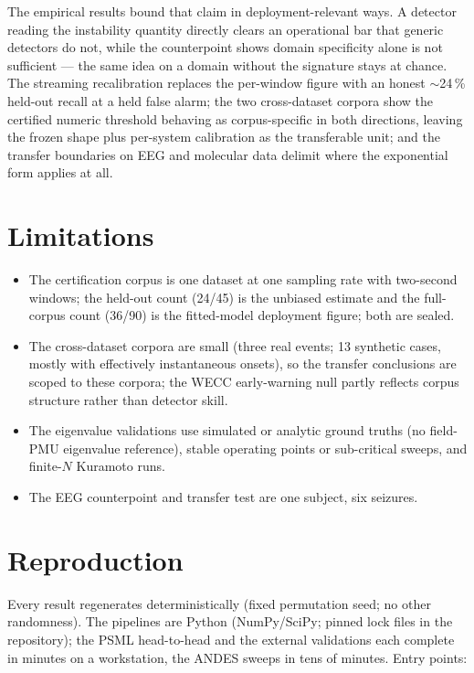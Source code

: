 \documentclass[aip,cha,preprint,amsmath,amssymb]{revtex4-2}
\begin{document}
The empirical results bound that claim in deployment-relevant ways. A
detector reading the instability quantity directly clears an
operational bar that generic detectors do not, while the counterpoint
shows domain specificity alone is not sufficient --- the same idea on a
domain without the signature stays at chance. The streaming
recalibration replaces the per-window figure with an honest
$\sim$24\,\% held-out recall at a held false alarm; the two
cross-dataset corpora show the certified numeric threshold behaving as
corpus-specific in both directions, leaving the frozen shape plus
per-system calibration as the transferable unit; and the transfer
boundaries on EEG and molecular data delimit where the exponential
form applies at all.

\section{Limitations}\label{sec:limitations}

\begin{itemize}
  \item The certification corpus is one dataset at one sampling rate
    with two-second windows; the held-out count (24/45) is the unbiased
    estimate and the full-corpus count (36/90) is the fitted-model
    deployment figure; both are sealed.
  \item The cross-dataset corpora are small (three real events; 13
    synthetic cases, mostly with effectively instantaneous onsets), so
    the transfer conclusions are scoped to these corpora; the WECC
    early-warning null partly reflects corpus structure rather than
    detector skill.
  \item The eigenvalue validations use simulated or analytic ground
    truths (no field-PMU eigenvalue reference), stable operating points
    or sub-critical sweeps, and finite-$N$ Kuramoto runs.
  \item The EEG counterpoint and transfer test are one subject, six
    seizures.
\end{itemize}

\section{Reproduction}\label{sec:reproduction}

Every result regenerates deterministically (fixed permutation seed; no
other randomness). The pipelines are Python (NumPy/SciPy; pinned lock
files in the repository); the PSML head-to-head and the external
validations each complete in minutes on a workstation, the ANDES sweeps
in tens of minutes. Entry points:
\end{document}
